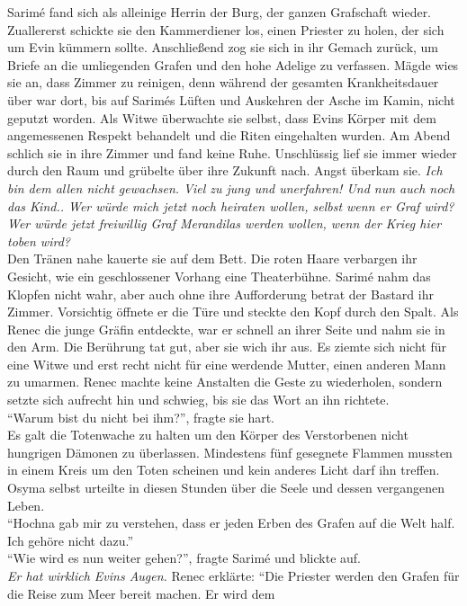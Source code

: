 Sarimé fand sich als alleinige Herrin der Burg, der ganzen Grafschaft wieder. Zuallererst schickte 
sie den Kammerdiener los, einen Priester zu holen, der sich um Evin kümmern sollte. Anschließend 
zog sie sich in ihr Gemach zurück, um Briefe an die umliegenden Grafen und den hohe Adelige zu 
verfassen. Mägde wies sie an, dass Zimmer zu reinigen, denn während der gesamten Krankheitsdauer 
über war dort, bis auf Sarimés Lüften und Auskehren der Asche im Kamin, nicht geputzt worden. Als 
Witwe überwachte sie selbst, dass Evins Körper mit dem angemessenen Respekt behandelt und die Riten 
eingehalten wurden. Am Abend schlich sie in ihre Zimmer und fand keine Ruhe. Unschlüssig lief sie 
immer wieder durch den Raum und grübelte über ihre Zukunft nach. Angst überkam sie.
\textit{Ich bin dem allen nicht gewachsen. Viel zu jung und unerfahren! Und nun auch noch das 
Kind.. Wer würde mich jetzt noch heiraten wollen, selbst wenn er Graf wird? Wer würde jetzt 
freiwillig Graf Merandilas werden wollen, wenn der Krieg hier toben wird?}\\
Den Tränen nahe kauerte sie auf dem Bett. Die roten Haare verbargen ihr Gesicht, wie ein 
geschlossener Vorhang eine Theaterbühne. Sarimé nahm das Klopfen nicht wahr, aber auch ohne ihre 
Aufforderung betrat der Bastard ihr Zimmer. Vorsichtig öffnete er die Türe und steckte den Kopf 
durch den Spalt. Als Renec die junge Gräfin entdeckte, war er schnell an ihrer Seite und nahm sie 
in den Arm. Die Berührung tat gut, aber sie wich ihr aus. Es ziemte sich nicht für eine Witwe und 
erst recht nicht für eine werdende Mutter, einen anderen Mann zu umarmen. Renec machte keine 
Anstalten die Geste zu wiederholen, sondern setzte sich aufrecht hin und schwieg, bis sie das Wort 
an ihn richtete.\\
``Warum bist du nicht bei ihm?'', fragte sie hart.\\
Es galt die Totenwache zu halten um den Körper des Verstorbenen nicht hungrigen Dämonen zu 
überlassen. Mindestens fünf gesegnete Flammen mussten in einem Kreis um den Toten scheinen und kein 
anderes Licht darf ihn treffen. Osyma selbst urteilte in diesen Stunden über die Seele und dessen 
vergangenen Leben.\\
``Hochna gab mir zu verstehen, dass er jeden Erben des Grafen auf die Welt half. Ich gehöre nicht 
dazu.''\\
``Wie wird es nun weiter gehen?'', fragte Sarimé und blickte auf.\\
\textit{Er hat wirklich Evins Augen.}
Renec erklärte: ``Die Priester werden den Grafen für die Reise zum Meer bereit machen. Er wird dem 
